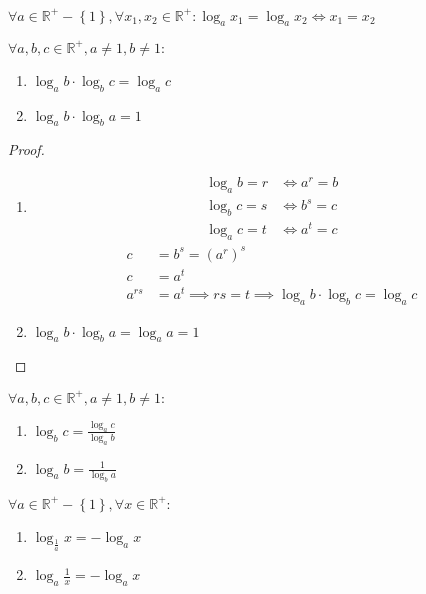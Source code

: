 \begin{veta}\label{zakl_reseni}
    $\forall a \in \mathbb R^+ - \left \{ 1 \right \},
    \forall x_1, x_2\in \mathbb R^+: \log_a x_1 = \log_a x_2 \iff x_1 = x_2$
\end{veta}

\begin{veta}
    $\forall a,b,c\in \mathbb R^+, a\ne 1, b\ne 1:$
    \begin{enumerate}[$i.$]
        \item $\log_a b \cdot \log_b c = \log_a c$
       	\item $\log_a b \cdot \log_b a = 1$
    \end{enumerate}
\end{veta}

\begin{proof}
    \begin{enumerate}[$i.$]
        \item \begin{align*}
            \log_a b = r &\iff a^r = b \\
            \log_b c = s &\iff b^s = c \\
            \log_a c = t &\iff a^t = c
        \end{align*}
        \begin{align*}
            c & =b^s=\left ( a^r \right )^s\\
            c & = a^t\\
            a^{rs} & = a^t \implies rs = t \implies \log_a b \cdot \log_b c = \log_a c
        \end{align*}
        \item $\log_a b\cdot \log_b a = \log_a a = 1$\qedhere
    \end{enumerate}
\end{proof}

\begin{veta}
    $\forall a,b,c\in \mathbb R^+, a\ne 1, b\ne 1:$
    \begin{enumerate}[$i.$]
        \item $\log_b c = \frac{\log_a c}{\log_a b}$
       	\item $\log_a b = \frac{1}{\log_b a}$
    \end{enumerate}
\end{veta}

\begin{veta}
    $\forall a \in \mathbb R^+ - \left \{ 1 \right \}  , \forall x \in \mathbb R^+:$
    \begin{enumerate}[$i.$]
        \item $\log_{\frac{1}{a}} x = -\log_a x$
       	\item $\log_a \frac{1}{x} = -\log_a x$
    \end{enumerate}
\end{veta}

